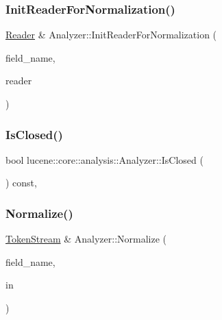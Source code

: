 \subsubsection{\texorpdfstring{Init\+Reader\+For\+Normalization()}{InitReaderForNormalization()}}
{\footnotesize\ttfamily \mbox{\hyperlink{classlucene_1_1core_1_1analysis_1_1Reader}{Reader}} \& Analyzer\+::\+Init\+Reader\+For\+Normalization (\begin{DoxyParamCaption}\item[{\mbox{\hyperlink{ZlibCrc32_8h_a2c212835823e3c54a8ab6d95c652660e}{const}} std\+::string \&}]{field\+\_\+name,  }\item[{\mbox{\hyperlink{classlucene_1_1core_1_1analysis_1_1Reader}{Reader}} \&}]{reader }\end{DoxyParamCaption})\hspace{0.3cm}{\ttfamily [protected]}}

\mbox{\label{classlucene_1_1core_1_1analysis_1_1Analyzer_a3a533567be4805332be57160b0364b79}} 
\subsubsection{\texorpdfstring{Is\+Closed()}{IsClosed()}}
{\footnotesize\ttfamily bool lucene\+::core\+::analysis\+::\+Analyzer\+::\+Is\+Closed (\begin{DoxyParamCaption}{ }\end{DoxyParamCaption}) const\hspace{0.3cm}{\ttfamily [inline]}, {\ttfamily [noexcept]}}

\mbox{\label{classlucene_1_1core_1_1analysis_1_1Analyzer_a9c76b9071c95ee8347b0f8ae2a208e6e}} 
\subsubsection{\texorpdfstring{Normalize()}{Normalize()}\hspace{0.1cm}{\footnotesize\ttfamily [1/2]}}
{\footnotesize\ttfamily \mbox{\hyperlink{classlucene_1_1core_1_1analysis_1_1TokenStream}{Token\+Stream}} \& Analyzer\+::\+Normalize (\begin{DoxyParamCaption}\item[{\mbox{\hyperlink{ZlibCrc32_8h_a2c212835823e3c54a8ab6d95c652660e}{const}} std\+::string \&}]{field\+\_\+name,  }\item[{\mbox{\hyperlink{classlucene_1_1core_1_1analysis_1_1TokenStream}{Token\+Stream}} \&}]{in }\end{DoxyParamCaption})\hspace{0.3cm}{\ttfamily [protected]}}

